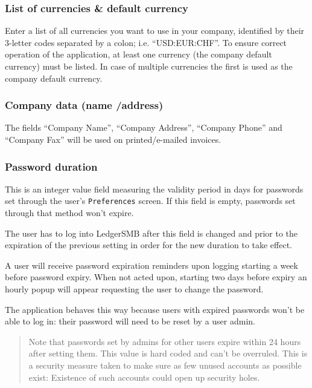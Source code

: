 \subsubsection{List of currencies \& default currency}
\label{subsubsec-company-config-defaults-currencies}

Enter a list of all currencies you want
to use in your company, identified by their 3-letter codes separated by a colon; i.e.
``USD:EUR:CHF''. To ensure correct operation of the application, at least one currency
(the company default currency) must be listed. In case of multiple currencies the first
is used as the company default currency.

\subsubsection{Company data (name /address)}
\label{subsubsec-company-config-defaults-name-address}

The fields ``Company Name'', ``Company Address'',
``Company Phone'' and ``Company Fax'' will be used on printed/e-mailed invoices.

\subsubsection{Password duration}
\label{subsubsec-company-config-defaults-password-duration}

This is an integer value field measuring the validity period in days for passwords set through
the user's \texttt{Preferences} screen. If this field is empty, passwords set through that method
won't expire.

The user has to log into LedgerSMB after this field is changed and prior to the expiration of the previous setting in order for the new duration to take effect.

A user will receive password  expiration reminders upon logging starting a week before password
expiry. When not acted upon, starting two days before expiry an hourly popup will appear
requesting the user to change the password.

The application behaves this way because users with expired passwords won't be able to log in:
their password will need to be reset by a user admin.

\begin{quote}
Note that passwords set by admins for other users expire  within 24 hours after setting them.
This value is hard coded and can't be overruled. This is a security measure taken to make
sure as few unused accounts as possible exist: Existence of such accounts could open up security
holes.
\end{quote}


